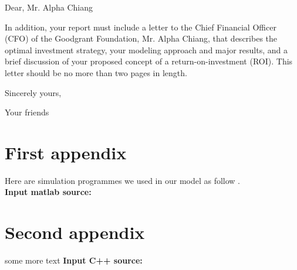 \documentclass{mcmthesis}
\begin{document}
\printbibliography

\newpage

\begin{letter}{Dear, Mr. Alpha Chiang}

    In addition, your report must include a letter to the Chief Financial Officer
    (CFO) of the Goodgrant Foundation, Mr. Alpha Chiang, that describes the optimal
    investment strategy, your modeling approach and major results, and a brief
    discussion of your proposed concept of a return-on-investment (ROI). This letter
    should be no more than two pages in length.

    \vspace{\parskip}

    Sincerely yours,

    Your friends

\end{letter}

\newpage

\begin{appendices}

    \section{First appendix}

    Here are simulation programmes we used in our model as follow .\\

    \textbf{\textcolor[rgb]{0.98,0.00,0.00}{Input matlab source:}}
    

    \section{Second appendix}

    some more text \textcolor[rgb]{0.98,0.00,0.00}{\textbf{Input C++ source:}}
    

\end{appendices}

\AImatter
\end{document}
